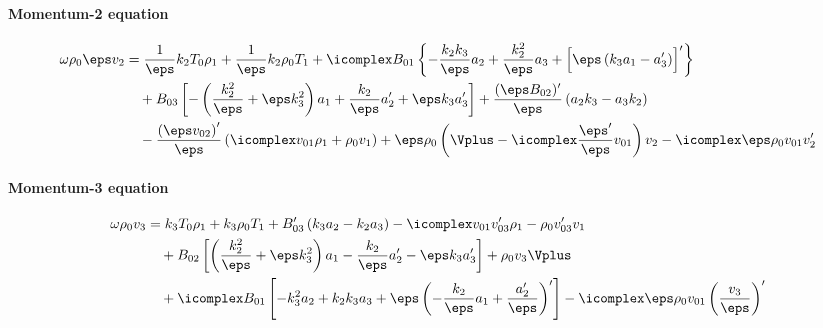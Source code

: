\paragraph{Momentum-2 equation}
{\customEquationFont
\begin{equation} \label{eq: full_momentum2}
  \begin{aligned}
  \omega\rho_0 \eps v_2 &=
    \frac{1}{\eps} k_2 T_0 \rho_1
    + \frac{1}{\eps}k_2 \rho_0 T_1
    + \icomplex B_{01} \left\{
      -\frac{k_2 k_3}{\eps}a_2  + \frac{k_2^2}{\eps}a_3 + \Bigl[\eps\left(k_3 a_1  - a_3'\right)\Bigr]'
    \right\} \\
    &\quad
    + B_{03} \left[- \left(\frac{k_2^2}{\eps} + \eps k_3^2\right)a_1  + \frac{ k_2}{\eps}a_2' +  \eps k_3a_3'\right]
    + \frac{(\eps B_{02})'}{\eps}\left(a_2 k_3 - a_3 k_2\right) \\
    &\quad
    - \frac{\left(\eps v_{02}\right)'}{\eps} \left(\icomplex v_{01} \rho_1 + \rho_0 v_1\right)
    + \eps\rho_0 \left(\Vplus - \icomplex \frac{\eps'}{\eps} v_{01}\right)v_2
    - \icomplex \eps \rho_0 v_{01} v_2'
  \end{aligned}
\end{equation}
}%


\paragraph{Momentum-3 equation}
{\customEquationFont
\begin{equation} \label{eq: full_momentum3}
  \begin{aligned}
    \omega \rho_0 v_3 &=
      k_3 T_0 \rho_1
      + k_3 \rho_0 T_1
		  + B_{03}' \left(k_3 a_2  - k_2 a_3\right)
      - \icomplex v_{01} v_{03}' \rho_1
      - \rho_0 v_{03}'v_1 \\
      &\quad
		  + B_{02} \left[
        \left(\frac{k_2^2}{\eps} + \eps k_3^2\right)a_1  - \frac{k_2}{\eps}a_2'  - \eps k_3 a_3'
      \right]
      + \rho_0 v_3 \Vplus \\
		&\quad
    + \icomplex B_{01} \left[
      -k_3^2 a_2  + k_2 k_3 a_3  + \eps\left(- \frac{k_2}{\eps}a_1 + \frac{a_2'}{\eps}\right)'
    \right]
    - \icomplex \eps \rho_0 v_{01} \left(\frac{v_3}{\eps}\right)'
  \end{aligned}
\end{equation}
}%

